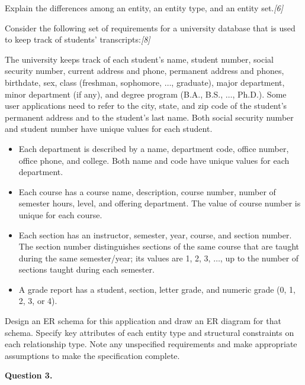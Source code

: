 \documentclass[11pt,a4paper]{article}
\newcommand{\pts}[1]{\hfill   \textit{[#1]}}
\begin{document}
\begin{parts}
  \item Explain the differences among an entity, an entity type, and an entity set.\pts{6}
  \item Consider the following set of requirements for a university database that is used to keep track of students' transcripts:\pts{8}
  
  The university keeps track of each student's name, student number, social security number, current address and phone, permanent address and phones, birthdate, sex, class (freshman, sophomore, $\dots$, graduate), major department, minor department (if any), and degree program (B.A., B.S., $\dots$, Ph.D.). Some user applications need to refer to the city, state, and zip code of the student's permanent address and to the student's last name. Both social security number and student number have unique values for each student.
  
  
\begin{itemize}[label= extbullet,leftmargin=1.5em]
    \item Each department is described by a name, department code, office number, office phone, and college. Both name and code have unique values for each department.
    \item Each course has a course name, description, course number, number of semester hours, level, and offering department. The value of course number is unique for each course.
    \item Each section has an instructor, semester, year, course, and section number. The section number distinguishes sections of the same course that are taught during the same semester/year; its values are 1, 2, 3, $\dots$, up to the number of sections taught during each semester.
    \item A grade report has a student, section, letter grade, and numeric grade (0, 1, 2, 3, or 4).
  \end{itemize}
  
  Design an ER schema for this application and draw an ER diagram for that schema. Specify key attributes of each entity type and structural constraints on each relationship type. Note any unspecified requirements and make appropriate assumptions to make the specification complete.
\end{parts}

\medskip


\noindent   \textbf{Question 3.}
\end{document}
